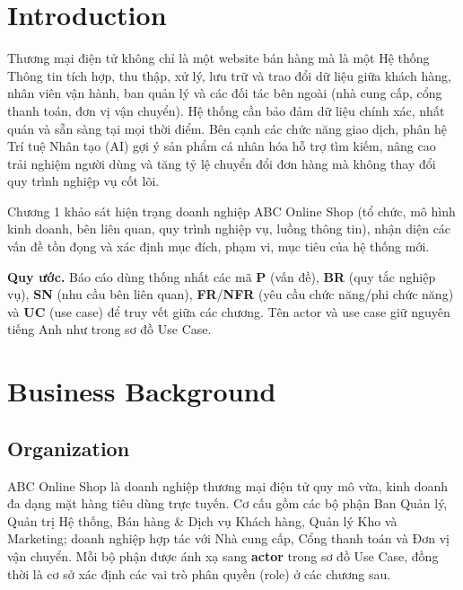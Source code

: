 \documentclass[12pt,a4paper,oneside]{report}
\begin{document}
\section{Introduction}

Thương mại điện tử không chỉ là một website bán hàng mà là một Hệ thống Thông tin tích hợp, thu thập, xử lý, lưu trữ và trao đổi dữ liệu giữa khách hàng, nhân viên vận hành, ban quản lý và các đối tác bên ngoài (nhà cung cấp, cổng thanh toán, đơn vị vận chuyển). Hệ thống cần bảo đảm dữ liệu chính xác, nhất quán và sẵn sàng tại mọi thời điểm. Bên cạnh các chức năng giao dịch, phân hệ Trí tuệ Nhân tạo (AI) gợi ý sản phẩm cá nhân hóa hỗ trợ tìm kiếm, nâng cao trải nghiệm người dùng và tăng tỷ lệ chuyển đổi đơn hàng mà không thay đổi quy trình nghiệp vụ cốt lõi.

Chương 1 khảo sát hiện trạng doanh nghiệp ABC Online Shop (tổ chức, mô hình kinh doanh, bên liên quan, quy trình nghiệp vụ, luồng thông tin), nhận diện các vấn đề tồn đọng và xác định mục đích, phạm vi, mục tiêu của hệ thống mới.

\textbf{Quy ước.} Báo cáo dùng thống nhất các mã \textbf{P} (vấn đề), \textbf{BR} (quy tắc nghiệp vụ), \textbf{SN} (nhu cầu bên liên quan), \textbf{FR}/\textbf{NFR} (yêu cầu chức năng/phi chức năng) và \textbf{UC} (use case) để truy vết giữa các chương. Tên actor và use case giữ nguyên tiếng Anh như trong sơ đồ Use Case.

\section{Business Background}

\subsection{Organization}

ABC Online Shop là doanh nghiệp thương mại điện tử quy mô vừa, kinh doanh đa dạng mặt hàng tiêu dùng trực tuyến. Cơ cấu gồm các bộ phận Ban Quản lý, Quản trị Hệ thống, Bán hàng \& Dịch vụ Khách hàng, Quản lý Kho và Marketing; doanh nghiệp hợp tác với Nhà cung cấp, Cổng thanh toán và Đơn vị vận chuyển. Mỗi bộ phận được ánh xạ sang \textbf{actor} trong sơ đồ Use Case, đồng thời là cơ sở xác định các vai trò phân quyền (role) ở các chương sau.
\end{document}
